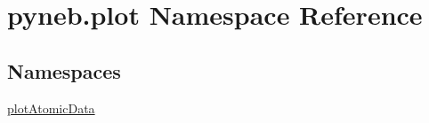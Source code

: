 \hypertarget{namespacepyneb_1_1plot}{}\section{pyneb.\+plot Namespace Reference}
\label{namespacepyneb_1_1plot}
\subsection*{Namespaces}
\begin{DoxyCompactItemize}
\item 
 \hyperlink{namespacepyneb_1_1plot_1_1plot_atomic_data}{plot\+Atomic\+Data}
\end{DoxyCompactItemize}
